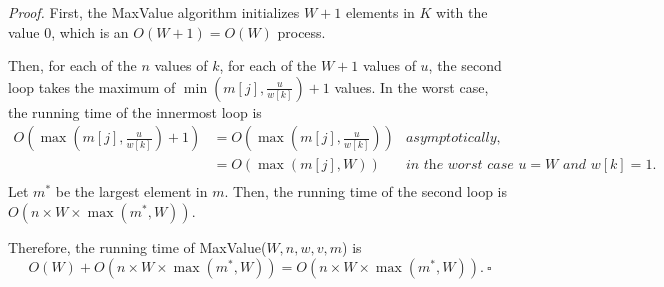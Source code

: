 \begin{enumerate}
\begin{solution}
\textit{Proof. }First, the {\sc MaxValue} algorithm initializes $W+1$ elements in $K$ with the value $0$, which is an $O(W+1)=O(W)$ process.

Then, for each of the $n$ values of $k$, for each of the $W+1$ values of $u$, the second loop takes the maximum of $\min\left(m[j],\frac{u}{w[k]}\right)+1$ values. In the worst case, the running time of the innermost loop is
\begin{align*}
O\left(\max\left(m[j],\frac{u}{w[k]}\right)+1\right)
&=O\left(\max\left(m[j],\frac{u}{w[k]}\right)\right)&\textit{asymptotically,}\\
&=O(\max(m[j],W))&\textit{in the worst case $u=W$ and $w[k]=1$.}\\
\end{align*}
Let $m^*$ be the largest element in $m$. Then, the running time of the second loop is $O(n\times W\times\max(m^*,W))$.

Therefore, the running time of {\sc MaxValue}($W,n,w,v,m$) is \[O(W)+O(n\times W\times\max(m^*,W))=O(n\times W\times\max(m^*,W)).~\square\]
\end{solution}
\end{enumerate}
